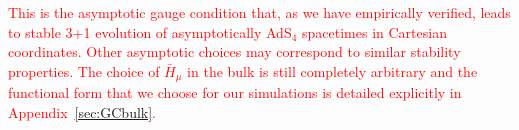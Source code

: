 \documentclass[a4paper,11pt]{article}
\numberwithin{equation}{section}
\begin{document}
\textcolor{red}{This is the asymptotic gauge condition that, as we have empirically verified, leads to stable 3+1 evolution of asymptotically AdS$_4$ spacetimes in Cartesian coordinates.
Other asymptotic choices may correspond to similar stability properties.
The choice of $\bar{H}_\mu$ in the bulk is still completely arbitrary and the functional form that we choose for our simulations is detailed explicitly in Appendix~\ref{sec:GCbulk}.}
\end{document}
